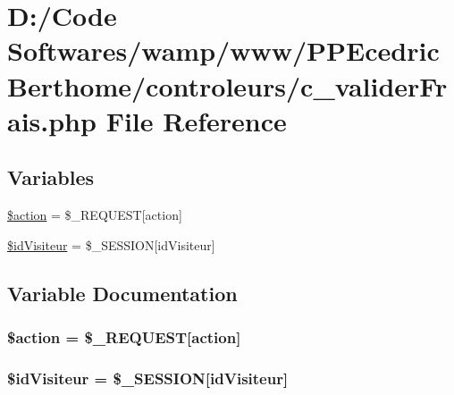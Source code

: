 \hypertarget{c__valider_frais_8php}{}\section{D\+:/\+Code Softwares/wamp/www/\+P\+P\+Ecedric\+Berthome/controleurs/c\+\_\+valider\+Frais.php File Reference}
\label{c__valider_frais_8php}
\subsection*{Variables}
\begin{DoxyCompactItemize}
\item 
\hyperlink{c__valider_frais_8php_aa698a3e72116e8e778be0e95d908ee30}{\$action} = \$\+\_\+\+R\+E\+Q\+U\+E\+ST\mbox{[}\textquotesingle{}action\textquotesingle{}\mbox{]}
\item 
\hyperlink{c__valider_frais_8php_a06480cb765d32df12f67a3589b6b9507}{\$id\+Visiteur} = \$\+\_\+\+S\+E\+S\+S\+I\+ON\mbox{[}\textquotesingle{}id\+Visiteur\textquotesingle{}\mbox{]}
\end{DoxyCompactItemize}


\subsection{Variable Documentation}
\subsubsection[{\texorpdfstring{\$action}{$action}}]{\setlength{\rightskip}{0pt plus 5cm}\$action = \$\+\_\+\+R\+E\+Q\+U\+E\+ST\mbox{[}\textquotesingle{}action\textquotesingle{}\mbox{]}}\hypertarget{c__valider_frais_8php_aa698a3e72116e8e778be0e95d908ee30}{}\label{c__valider_frais_8php_aa698a3e72116e8e778be0e95d908ee30}
\subsubsection[{\texorpdfstring{\$id\+Visiteur}{$idVisiteur}}]{\setlength{\rightskip}{0pt plus 5cm}\$id\+Visiteur = \$\+\_\+\+S\+E\+S\+S\+I\+ON\mbox{[}\textquotesingle{}id\+Visiteur\textquotesingle{}\mbox{]}}\hypertarget{c__valider_frais_8php_a06480cb765d32df12f67a3589b6b9507}{}\label{c__valider_frais_8php_a06480cb765d32df12f67a3589b6b9507}
